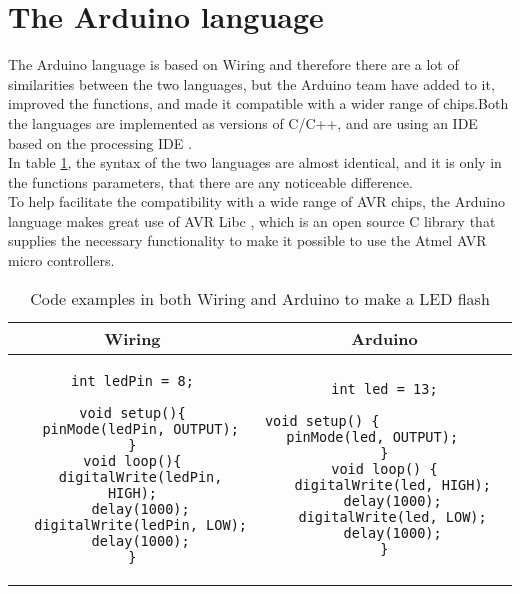 \section{The Arduino language}
The Arduino language is based on Wiring and therefore there are a lot of similarities between the two languages, but the Arduino team have added to it, improved the functions, and made it compatible with a wider range of chips.Both the languages are implemented as versions of C/C++, and are using an IDE based on the processing IDE \cite{Wiring:thesis}\cite{Arduino:IDE}.\\

In table \ref{tabel:comparison}, the syntax of the two languages are almost identical, and it is only in the functions parameters, that there are any noticeable difference.\\ 
To help facilitate the compatibility with a wide range of AVR chips, the Arduino language makes great use of AVR Libc \cite{AVR:lib}, which is an open source C library that supplies the necessary functionality to make it possible to use the Atmel AVR micro controllers.\\

\begin{table}[H]
\centering
\begin{tabular}{cc}
Wiring 
& 
Arduino \\ 
\hline 
\begin{lstlisting}
int ledPin = 8;

void setup(){
  pinMode(ledPin, OUTPUT);
}
void loop(){
  digitalWrite(ledPin, HIGH);
  delay(1000);
  digitalWrite(ledPin, LOW);
  delay(1000);
}
\end{lstlisting}  
& 
\begin{lstlisting}
int led = 13;

void setup() {                
  pinMode(led, OUTPUT);     
}
void loop() {
  digitalWrite(led, HIGH);
  delay(1000);
  digitalWrite(led, LOW);
  delay(1000);
}
\end{lstlisting} 
\end{tabular} 
\caption{Code examples in both Wiring and Arduino to make a LED flash}
\label{tabel:comparison}
\end{table}

